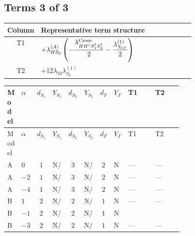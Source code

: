 \documentclass[8pt]{article}
\begin{document}
\begin{landscape}
\subsection*{Terms 3 of 3}
\begin{center}
\begin{tabular}{@{}c >{\raggedright\arraybackslash}p{0.82\linewidth}@{}}
\toprule
Column & Representative term structure \\
\midrule
T1 & \(\displaystyle +{\lambda_{HS_2}^{(A)}} \left(-\frac{{\lambda_{H H^\dagger S_1^\dagger S_2^\dagger}^{\rm Cross}}}{2}-\frac{{\lambda_{X_{17}}^{(1)}}}{2}\right)\) \\
\midrule
T2 & \(\displaystyle +12 {\lambda_{10}} {\lambda_{S_2}^{(1)}}\) \\
\midrule
\bottomrule
\end{tabular}
\end{center}
\smallskip
\tiny
\begin{longtable}{@{}llcccccc >{\raggedright\arraybackslash}p{0.21\linewidth} >{\raggedright\arraybackslash}p{0.21\linewidth}@{}}
\toprule
Model & $\alpha$ & $d_{S_1}$ & $Y_{S_1}$ & $d_{S_2}$ & $Y_{S_2}$ & $d_F$ & $Y_F$ & T1 & T2 \\
\midrule
\endfirsthead
\toprule
Model & $\alpha$ & $d_{S_1}$ & $Y_{S_1}$ & $d_{S_2}$ & $Y_{S_2}$ & $d_F$ & $Y_F$ & T1 & T2 \\
\midrule
\endhead
A & $0$ & $1$ & $\text{N/A}$ & $3$ & $\text{N/A}$ & $2$ & $\text{N/A}$ & --- & --- \\
\midrule
A & $-2$ & $1$ & $\text{N/A}$ & $3$ & $\text{N/A}$ & $2$ & $\text{N/A}$ & --- & --- \\
\midrule
A & $-4$ & $1$ & $\text{N/A}$ & $3$ & $\text{N/A}$ & $2$ & $\text{N/A}$ & --- & --- \\
\midrule
B & $1$ & $2$ & $\text{N/A}$ & $2$ & $\text{N/A}$ & $1$ & $\text{N/A}$ & --- & --- \\
\midrule
B & $-1$ & $2$ & $\text{N/A}$ & $2$ & $\text{N/A}$ & $1$ & $\text{N/A}$ & \scriptsize\adjustbox{max width=\linewidth}{$\begin{gathered} +{\lambda_{HS_2}^{(A)}} \left(-\frac{{\lambda_{H H^\dagger S_1^\dagger S_2^\dagger}^{\rm Cross}}}{2}-\frac{{\lambda_{X_{17}}^{(1)}}}{2}\right)\end{gathered}$} & \scriptsize\adjustbox{max width=\linewidth}{$\begin{gathered} +12 {\lambda_{10}} {\lambda_{S_2}^{(1)}}\end{gathered}$} \\
\midrule
B & $-3$ & $2$ & $\text{N/A}$ & $2$ & $\text{N/A}$ & $1$ & $\text{N/A}$ & --- & --- \\

\end{longtable}
\end{landscape}
\end{document}
